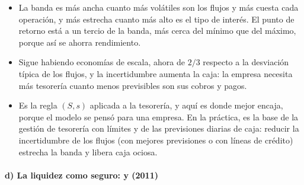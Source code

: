 \documentclass[11pt]{article}
\begin{document}
\begin{itemize}
\item La banda es más ancha cuanto más volátiles son los flujos y más cuesta cada operación, y más estrecha cuanto más alto es el tipo de interés. El punto de retorno está a un tercio de la banda, más cerca del mínimo que del máximo, porque así se ahorra rendimiento.
\item Sigue habiendo economías de escala, ahora de $2/3$ respecto a la desviación típica de los flujos, y la incertidumbre aumenta la caja: la empresa necesita más tesorería cuanto menos previsibles son sus cobros y pagos.
\item Es la regla $(S,s)$ aplicada a la tesorería, y aquí es donde mejor encaja, porque el modelo se pensó para una empresa. En la práctica, es la base de la gestión de tesorería con límites y de las previsiones diarias de caja: reducir la incertidumbre de los flujos (con mejores previsiones o con líneas de crédito) estrecha la banda y libera caja ociosa.
\end{itemize}

\paragraph{d) La liquidez como seguro:  y  (2011)}
\end{document}

